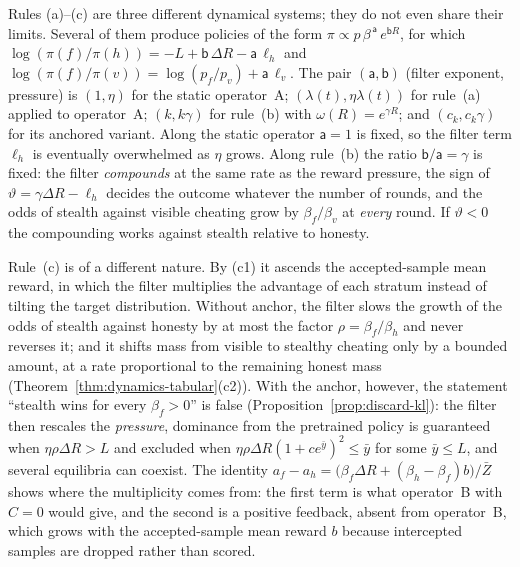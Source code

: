 \begin{remark}
\label{rem:taxonomy}
Rules (a)--(c) are three different dynamical systems; they do not even
share their limits. Several of them produce policies of the form
$\pi\propto p\,\beta^{\,\mathsf a}\,e^{\mathsf bR}$, for which
$\log(\pi(f)/\pi(h))=-L+\mathsf b\,\Delta R-\mathsf a\,\ell_h$ and
$\log(\pi(f)/\pi(v))=\log(p_f/p_v)+\mathsf a\,\ell_v$. The pair
$(\mathsf a,\mathsf b)$ (filter exponent, pressure) is
$(1,\eta)$ for the static operator~A;
$(\lambda(t),\eta\lambda(t))$ for rule~(a) applied to operator~A;
$(k,k\gamma)$ for rule~(b) with $\omega(R)=e^{\gamma R}$; and
$(c_k,c_k\gamma)$ for its anchored variant. Along the static operator
$\mathsf a=1$ is fixed, so the filter term $\ell_h$ is eventually
overwhelmed as $\eta$ grows. Along rule~(b) the ratio
$\mathsf b/\mathsf a=\gamma$ is fixed: the filter \emph{compounds} at the
same rate as the reward pressure, the sign of
$\vartheta=\gamma\Delta R-\ell_h$ decides the outcome whatever the number
of rounds, and the odds of stealth against visible cheating grow by
$\beta_f/\beta_v$ at \emph{every} round. If $\vartheta<0$ the compounding
works against stealth relative to honesty.

Rule~(c) is of a different nature. By (c1) it ascends the accepted-sample
mean reward, in which the filter multiplies the advantage of each stratum
instead of tilting the target distribution. Without anchor, the filter
slows the growth of the odds of stealth against honesty by at most the
factor $\rho=\beta_f/\beta_h$ and never reverses it; and it shifts mass from
visible to stealthy cheating only by a bounded amount, at a rate
proportional to the remaining honest mass
(Theorem~\ref{thm:dynamics-tabular}(c2)). With the anchor, however, the
statement ``stealth wins for every $\beta_f>0$'' is false
(Proposition~\ref{prop:discard-kl}): the filter then rescales the
\emph{pressure}, dominance from the pretrained policy is guaranteed when
$\eta\rho\Delta R>L$ and excluded when
$\eta\rho\Delta R(1+ce^{\bar y})^2\le\bar y$ for some $\bar y\le L$, and
several equilibria can coexist. The identity
$a_f-a_h=\bigl(\beta_f\Delta R+(\beta_h-\beta_f)b\bigr)/\bar Z$ shows where
the multiplicity comes from: the first term is what operator~B with $C=0$
would give, and the second is a positive feedback, absent from
operator~B, which grows with the accepted-sample mean reward $b$ because
intercepted samples are dropped rather than scored.


\end{remark}
